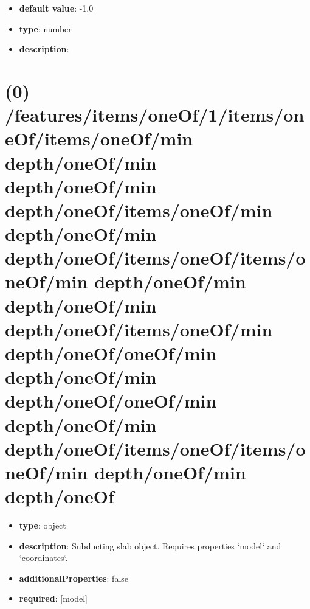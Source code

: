\begin{itemize}[leftmargin=5em]\item {\bf default value}: -1.0
\item {\bf type}: number
\item {\bf description}: 
\end{itemize}\section{(0) /features/items/oneOf/1/items/oneOf/items/oneOf/min depth/oneOf/min depth/oneOf/min depth/oneOf/items/oneOf/min depth/oneOf/min depth/oneOf/items/oneOf/items/oneOf/min depth/oneOf/min depth/oneOf/min depth/oneOf/items/oneOf/min depth/oneOf/oneOf/min depth/oneOf/min depth/oneOf/oneOf/min depth/oneOf/min depth/oneOf/items/oneOf/items/oneOf/min depth/oneOf/min depth/oneOf}
\begin{itemize}[leftmargin=0em]\item {\bf type}: object
\item {\bf description}: Subducting slab object. Requires properties `model` and `coordinates`.
\item {\bf additionalProperties}: false
\item {\bf required}: [model]\end{itemize}

